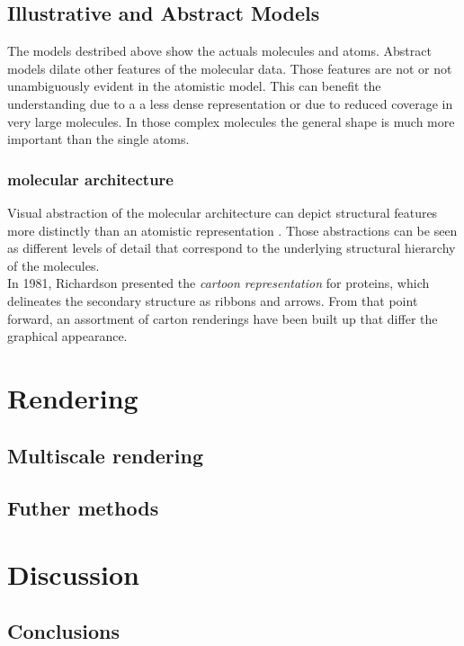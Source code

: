 \documentclass{egpubl}
\begin{document}
\subsection{Illustrative and Abstract Models}
\label{RepMet:abstract}
The models destribed above show the actuals molecules and atoms. Abstract models dilate other features of the molecular data. Those features are not or not unambiguously evident in the atomistic model.  
This can benefit the understanding due to a a less dense representation or due to reduced coverage in very large molecules. In those complex molecules the general shape is much more important than the single atoms.\cite{VisBioSota}

\subsubsection{molecular architecture}
Visual abstraction of the molecular architecture can depict structural features more distinctly than an atomistic representation \cite{VisBioSota}. Those abstractions can be seen as different levels of detail that correspond to the underlying structural hierarchy of the molecules\cite{VisBioSota}. \\


In 1981, Richardson\cite{Anfinsen.1981} presented the \textit{cartoon representation} for proteins, which delineates the secondary structure as ribbons and arrows. From that point forward, an assortment of carton renderings have been built up that differ the graphical appearance.

\section{Rendering} %

\subsection{Multiscale rendering}

\subsection{Futher methods}


\section{Discussion}



\subsection{Conclusions}


%
%
%
\end{document}
